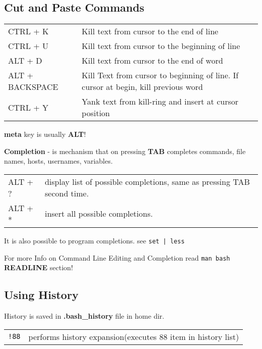 \documentclass[8pt]{extarticle}
\begin{document}
\begin{multicols}{2}
\subsection{Cut and Paste Commands}
\begin{tabular}{ll}
	CTRL + K & Kill text from cursor to the end of line\\
	CTRL + U & Kill text from cursor to the beginning of line\\
	ALT + D & Kill text from cursor to the end of word\\
	ALT + BACKSPACE & Kill Text from cursor to beginning of line. If cursor at begin, kill previous word\\
	CTRL + Y & Yank text from kill-ring and insert at cursor position
\end{tabular}

\textbf{meta} key is usually \textbf{ALT}!

\textbf{Completion} - is mechanism that on pressing \textbf{TAB} completes commands, file names, hosts, usernames, variables.

\begin{tabular}{ll}
	ALT + ? & display list of possible completions, same as pressing TAB second time.\\
	ALT + * & insert all possible completions.
\end{tabular}

It is also possible to program completions. see \texttt{set | less}

For more Info on Command Line Editing and Completion read \texttt{man bash} \textbf{READLINE} section!

\subsection{Using History}

History is saved in \textbf{.bash\_history} file in home dir.

\begin{tabular}{ll}
	\texttt{!88} & performs history expansion(executes 88 item in history list)
\end{tabular}


\end{multicols}
\end{document}

